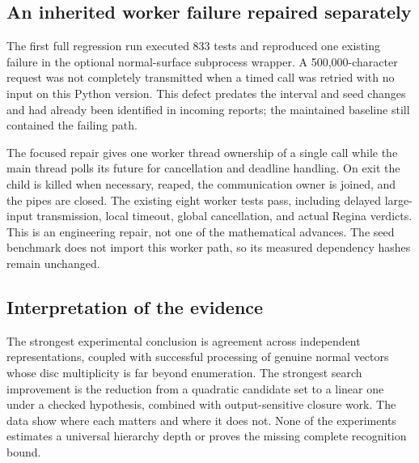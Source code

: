 \subsection{An inherited worker failure repaired separately}

The first full regression run executed 833 tests and reproduced one
existing failure in the optional normal-surface subprocess wrapper. A
500,000-character request was not completely transmitted when a timed
 call was retried with no input on this Python version.
This defect predates the interval and seed changes and had already been
identified in incoming reports; the maintained baseline still contained
the failing path.

The focused repair gives one worker thread ownership of a single
 call while the main thread polls its future
for cancellation and deadline handling. On exit the child is killed
when necessary, reaped, the communication owner is joined, and the pipes
are closed. The existing eight worker tests pass, including delayed
large-input transmission, local timeout, global cancellation, and
actual Regina verdicts. This is an engineering repair, not one of the
mathematical advances. The seed benchmark does not import this worker
path, so its measured dependency hashes remain unchanged.

\subsection{Interpretation of the evidence}

The strongest experimental conclusion is agreement across independent
representations, coupled with successful processing of genuine normal
vectors whose disc multiplicity is far beyond enumeration. The strongest
search improvement is the reduction from a quadratic candidate set to
a linear one under a checked hypothesis, combined with output-sensitive
closure work. The data show where each matters and where it does not.
None of the experiments estimates a universal hierarchy depth or proves
the missing complete recognition bound.
